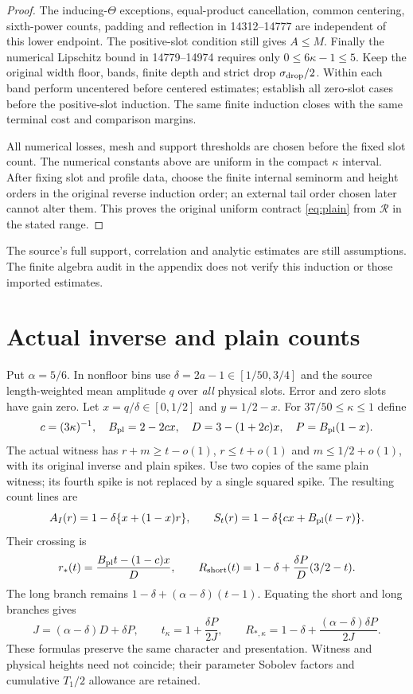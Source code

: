 \documentclass[11pt,a4paper]{article}
\theoremstyle{definition}
\begin{document}
\begin{proof}
The inducing-$\Theta$ exceptions, equal-product cancellation,
common centering, sixth-power counts, padding and reflection in
14312--14777 are independent of this lower endpoint.
The positive-slot condition still gives $A\le M$.
Finally the numerical Lipschitz bound in 14779--14974 requires
only $0\le6\kappa-1\le5$. Keep the original width floor, bands,
finite depth and strict drop $\sigma_{\rm drop}/2$.
Within each band perform uncentered before centered estimates;
establish all zero-slot cases before the positive-slot induction.
The same finite induction closes with the same terminal cost and
comparison margins.

All numerical losses, mesh and support thresholds are chosen
before the fixed slot count. The numerical constants above are
uniform in the compact $\kappa$ interval. After fixing slot and
profile data, choose the finite internal seminorm and height orders
in the original reverse induction order; an external tail order
chosen later cannot alter them. This proves the original uniform
contract \eqref{eq:plain} from $\mathcal R$ in the stated range.
\end{proof}

The source's full support, correlation and analytic estimates
are still assumptions. The finite algebra audit in the appendix
does not verify this induction or those imported estimates.

\section{Actual inverse and plain counts}
\label{sec:counts}
Put $\alpha=5/6$. In nonfloor bins use
$\delta=2a-1\in[1/50,3/4]$ and the source length-weighted
mean amplitude $q$ over \emph{all} physical slots.
Error and zero slots have gain zero. Let
$x=q/\delta\in[0,1/2]$ and $y=1/2-x$.
For $37/50\le\kappa\le1$ define
\begin{equation}\label{eq:DP}
 c=(3\kappa)^{-1},\quad B_{\rm pl}=2-2cx,\quad
 D=3-(1+2c)x,\quad P=B_{\rm pl}(1-x).
\end{equation}
The actual witness has
$r+m\ge t-o(1)$, $r\le t+o(1)$ and $m\le1/2+o(1)$,
with its original inverse and plain spikes.
Use two copies of the same plain witness; its fourth spike is
not replaced by a single squared spike. The resulting count lines are
\[
 A_I(r)=1-\delta\{x+(1-x)r\},\qquad
 S_t(r)=1-\delta\{cx+B_{\rm pl}(t-r)\}.
\]
Their crossing is
\[
 r_*(t)=\frac{B_{\rm pl}t-(1-c)x}{D},\qquad
 R_{\rm short}(t)=1-\delta+\frac{\delta P}{D}(3/2-t).
\]
The long branch remains
$1-\delta+(\alpha-\delta)(t-1)$.
Equating the short and long branches gives
\begin{equation}\label{eq:R}
 J=(\alpha-\delta)D+\delta P,\qquad
 t_\kappa=1+\frac{\delta P}{2J},\qquad
 R_{*,\kappa}=1-\delta+
           \frac{(\alpha-\delta)\delta P}{2J}.
\end{equation}
These formulas preserve the same character and presentation.
Witness and physical heights need not coincide; their parameter
Sobolev factors and cumulative $T_1/2$ allowance are retained.
\end{document}
